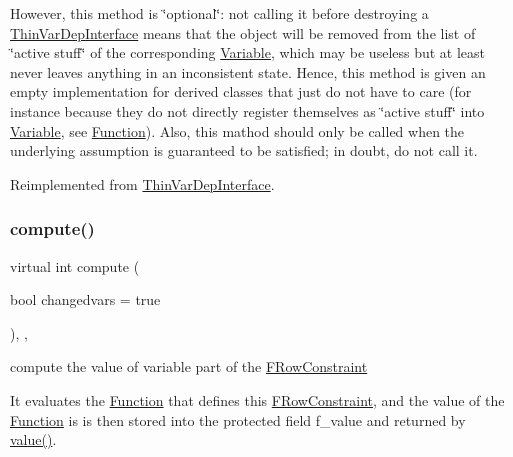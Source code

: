 However, this method is \char`\"{}optional\char`\"{}\+: not calling it before destroying a \mbox{\hyperlink{class_s_m_spp__di__unipi__it_1_1_thin_var_dep_interface}{Thin\+Var\+Dep\+Interface}} means that the object will be removed from the list of \char`\"{}active stuff\char`\"{} of the corresponding \mbox{\hyperlink{class_s_m_spp__di__unipi__it_1_1_variable}{Variable}}, which may be useless but at least never leaves anything in an inconsistent state. Hence, this method is given an empty implementation for derived classes that just do not have to care (for instance because they do not directly register themselves as \char`\"{}active stuff\char`\"{} into \mbox{\hyperlink{class_s_m_spp__di__unipi__it_1_1_variable}{Variable}}, see \mbox{\hyperlink{class_s_m_spp__di__unipi__it_1_1_function}{Function}}). Also, this mathod should only be called when the underlying assumption is guaranteed to be satisfied; in doubt, do not call it. 

Reimplemented from \mbox{\hyperlink{group___thin_var_dep_interface___c_l_a_s_s_e_s_gae16067de85b435fac4ce8558b193a99a}{Thin\+Var\+Dep\+Interface}}.

\mbox{\label{class_s_m_spp__di__unipi__it_1_1_f_row_constraint_afc8ff54ab05d22f4cca0fb0bfbeb7a49}} 
\subsubsection{\texorpdfstring{compute()}{compute()}}
{\footnotesize\ttfamily virtual int compute (\begin{DoxyParamCaption}\item[{bool}]{changedvars = {\ttfamily true} }\end{DoxyParamCaption})\hspace{0.3cm}{\ttfamily [inline]}, {\ttfamily [override]}, {\ttfamily [virtual]}}



compute the value of variable part of the \mbox{\hyperlink{class_s_m_spp__di__unipi__it_1_1_f_row_constraint}{F\+Row\+Constraint}} 

It evaluates the \mbox{\hyperlink{class_s_m_spp__di__unipi__it_1_1_function}{Function}} that defines this \mbox{\hyperlink{class_s_m_spp__di__unipi__it_1_1_f_row_constraint}{F\+Row\+Constraint}}, and the value of the \mbox{\hyperlink{class_s_m_spp__di__unipi__it_1_1_function}{Function}} is is then stored into the protected field f\+\_\+value and returned by \mbox{\hyperlink{class_s_m_spp__di__unipi__it_1_1_f_row_constraint_ad9256be16b98f3b557f54fa5e2118db7}{value()}}. 

